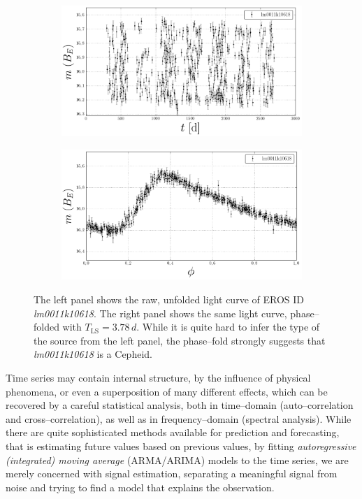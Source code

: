 \begin{figure}[h]
	\centering
	\begin{subfigure}[t]{0.49\textwidth}
		\centering
		\label{fig:lightcurve-unfolded}
		\includegraphics[width=\textwidth]{figures/time-series/lm0011k10618.png}				
	\end{subfigure}
	\begin{subfigure}[t]{0.49\textwidth}
		\centering
		\label{fig:lightcurve-folded}
		\includegraphics[width=\textwidth]{figures/time-series/lm0011k10618-folded.png}				
	\end{subfigure}
	\caption[Raw and pase--folded light curve]{The left panel shows the raw, unfolded light curve of EROS ID \emph{lm0011k10618}. The right panel shows the same light curve, phase--folded with $T_{\text{LS}} = 3.78 \, \unit{d}$. While it is quite hard to infer the type of the source from the left panel, the phase--fold strongly suggests that \emph{lm0011k10618} is a Cepheid.}
	\label{fig:unfolded-folded-light-curve}
\end{figure}

Time series may contain internal structure, \eg by the influence of physical phenomena, or even a superposition of many different effects, which can be recovered by a careful statistical analysis, both in time--domain (auto--correlation and cross--correlation), as well as in frequency--domain (spectral analysis). While there are quite sophisticated methods available for prediction and forecasting, that is estimating future values based on previous values, \eg by fitting \emph{autoregressive (integrated) moving average} (ARMA/ARIMA) models to the time series, we are merely concerned with signal estimation, \ie separating a meaningful signal from noise and trying to find a model that explains the observation.\\

